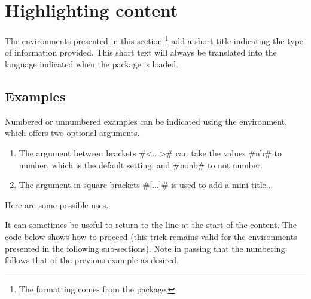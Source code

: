 \documentclass[10pt, a4paper]{article}
\begin{document}
\section{Highlighting content}

\begin{tdocnote}
    The environments presented in this section
    \footnote{
        The formatting comes from the  package.
    }
    add a short title indicating the type of information provided.
    This short text will always be translated into the language indicated when the \thispack{} package is loaded.
\end{tdocnote}



\subsection{Examples}

Numbered or unnumbered examples can be indicated using the  environment, which offers two optional arguments.

\begin{enumerate}
    \item The  argument between brackets \tdocinlatex#<...># can take the values \tdocinlatex#nb# to number, which is the default setting, and \tdocinlatex#nonb# to not number.

    \item The  argument in square brackets \tdocinlatex#[...]# is used to add a mini-title..
\end{enumerate}


Here are some possible uses.









\begin{tdoctip}
    It can sometimes be useful to return to the line at the start of the content. The code below shows how to proceed (this trick remains valid for the environments presented in the following sub-sections). Note in passing that the numbering follows that of the previous example as desired.
\end{tdoctip}

\end{document}
